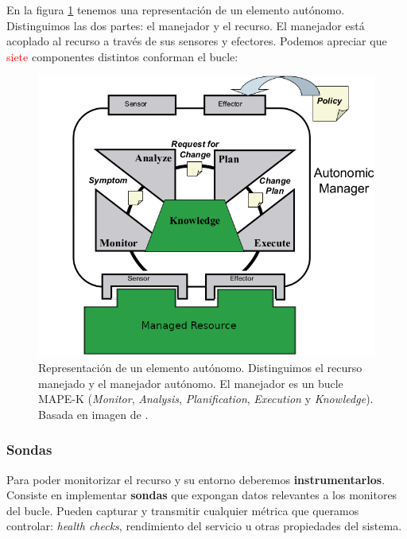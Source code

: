 En la figura \ref{fig:autonomic-element} tenemos una representación de un elemento autónomo. Distinguimos las dos partes: el manejador y el recurso. El manejador está acoplado al recurso a través de sus sensores y efectores. Podemos apreciar que \textcolor{red}{siete} componentes distintos conforman el bucle: \cite{ibmcorporationArchitecturalBlueprintAutonomic2006}

\begin{figure}[h]
  \centering
  \includegraphics[scale=2]{02_contexto_tecnologico/images/autonomic-element}
  \caption[Representación de un elemento autónomo. Distinguimos el recurso manejado y el manejador autónomo. El manejador es un bucle MAPE-K (\emph{Monitor}, \emph{Analysis}, \emph{Planification}, \emph{Execution} y \emph{Knowledge})]{Representación de un elemento autónomo. Distinguimos el recurso manejado y el manejador autónomo. El manejador es un bucle MAPE-K (\emph{Monitor}, \emph{Analysis}, \emph{Planification}, \emph{Execution} y \emph{Knowledge}). Basada en imagen de \cite{ibmcorporationArchitecturalBlueprintAutonomic2006}.}
  \label{fig:autonomic-element}
\end{figure}

\subsubsection{Sondas}
Para poder monitorizar el recurso y su entorno deberemos \textbf{instrumentarlos}. Consiste en implementar \textbf{sondas} que expongan datos relevantes a los monitores del bucle. Pueden capturar y transmitir cualquier métrica que queramos controlar: \emph{health checks}, rendimiento del servicio u otras propiedades del sistema.

